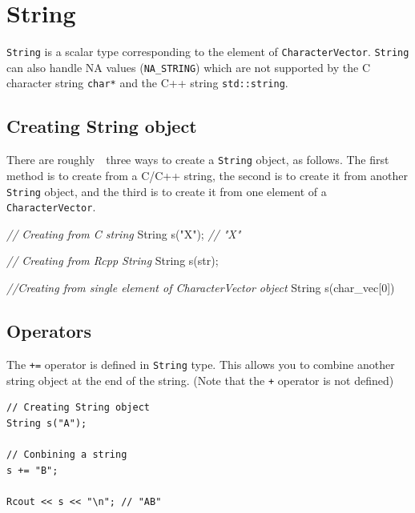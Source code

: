 \documentclass[
]{book}
\newenvironment{Shaded}{\begin{snugshade}}{\end{snugshade}}
\newcommand{\CommentTok}[1]{\textcolor[rgb]{0.56,0.35,0.01}{\textit{#1}}}
\newcommand{\DecValTok}[1]{\textcolor[rgb]{0.00,0.00,0.81}{#1}}
\newcommand{\NormalTok}[1]{#1}
\newcommand{\StringTok}[1]{\textcolor[rgb]{0.31,0.60,0.02}{#1}}
\begin{document}
\hypertarget{string}{%
\chapter{String}\label{string}}

\texttt{String} is a scalar type corresponding to the element of \texttt{CharacterVector}. \texttt{String} can also handle NA values (\texttt{NA\_STRING}) which are not supported by the C character string \texttt{char*} and the C++ string \texttt{std::string}.

\hypertarget{creating-string-object}{%
\section{Creating String object}\label{creating-string-object}}

There are roughly　three ways to create a \texttt{String} object, as follows. The first method is to create from a C/C++ string, the second is to create it from another \texttt{String} object, and the third is to create it from one element of a \texttt{CharacterVector}.

\begin{Shaded}
\begin{Highlighting}[]
\CommentTok{// Creating from C string}
\NormalTok{String s(}\StringTok{"X"}\NormalTok{); }\CommentTok{// "X"}

\CommentTok{// Creating from Rcpp String}
\NormalTok{String s(str);}

\CommentTok{//Creating from single element of CharacterVector object}
\NormalTok{String s(char_vec[}\DecValTok{0}\NormalTok{])}
\end{Highlighting}
\end{Shaded}

\hypertarget{operators}{%
\section{Operators}\label{operators}}

The \texttt{+=} operator is defined in \texttt{String} type. This allows you to combine another string object at the end of the string. (Note that the \texttt{+} operator is not defined)

\begin{verbatim}
// Creating String object
String s("A");

// Conbining a string
s += "B";

Rcout << s << "\n"; // "AB"
\end{verbatim}
\end{document}
